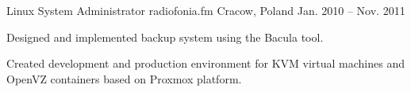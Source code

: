 \begin{cventries}
  \cventry
    {Linux System Administrator} %
    {radiofonia.fm} %
    {Cracow, Poland} %
    {Jan. 2010 – Nov. 2011} %
    {
      \begin{cvitems} %
        \item {Designed and implemented backup system using the Bacula tool.}
        \item {Created development and production environment for KVM virtual machines and OpenVZ containers based on Proxmox platform.}
      \end{cvitems}
    }

\end{cventries}
